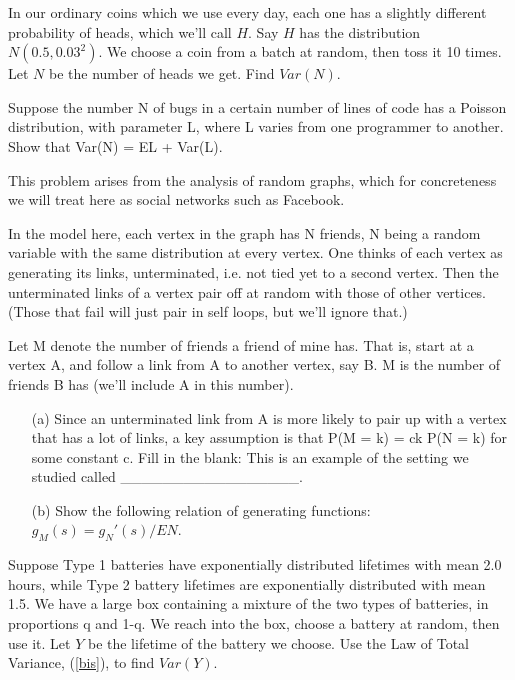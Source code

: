 \oneproblem
In our ordinary coins which we use every day, each one has a slightly 
different probability of heads, which we'll call $H$.  Say $H$ has 
the distribution $N(0.5, 0.03^2)$.  We choose a coin from a batch at 
random, then toss it 10 times.  Let $N$ be the number of heads we get.  
Find $Var(N)$.

\oneproblem
Suppose the number N of bugs in a certain number of lines of code has a
Poisson distribution, with parameter L, where L varies from one
programmer to another. Show that Var(N) = EL + Var(L).

\oneproblem
This problem arises from the analysis of random graphs, which for
concreteness we will treat here as social networks such as Facebook.

In the model here, each vertex in the graph has N friends, N being a
random variable with the same distribution at every vertex. One thinks
of each vertex as generating its links, unterminated, i.e. not tied yet
to a second vertex. Then the unterminated links of a vertex pair off at
random with those of other vertices. (Those that fail will just pair in
self loops, but we'll ignore that.)

Let M denote the number of friends a friend of mine has. That is, start
at a vertex A, and follow a link from A to another vertex, say B. M is
the number of friends B has (we'll include A in this number).

\begin{itemize}

\item [(a)] Since an unterminated link from A is more likely to pair up
with a vertex that has a lot of links, a key assumption is that P(M = k)
= ck P(N = k) for some constant c. Fill in the blank: This is an example
of the setting we studied called \_\_\_\_\_\_\_\_\_\_\_\_\_\_\_\_\_.

\item [(b)] Show the following relation of generating functions: $g_M(s)
= g_N'(s)/EN$. 

\end{itemize}

\oneproblem
Suppose Type 1 batteries have exponentially distributed lifetimes with
mean 2.0 hours, while Type 2 battery lifetimes are exponentially
distributed with mean 1.5.  We have a large box containing a mixture of
the two types of batteries, in proportions q and 1-q.  We reach into the
box, choose a battery at random, then use it.  Let $Y$ be the lifetime
of the battery we choose.  Use the Law of Total Variance, (\ref{bis}),
to find $Var(Y)$.


